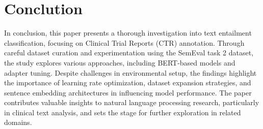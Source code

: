 \section{Conclution}

In conclusion, this paper presents a thorough investigation into text entailment classification, 
focusing on Clinical Trial Reports (CTR) annotation. Through careful dataset curation and 
experimentation using the SemEval task 2 dataset, the study explores various approaches, 
including BERT-based models and adapter tuning. Despite challenges in environmental setup, 
the findings highlight the importance of learning rate optimization, dataset expansion 
strategies, and sentence embedding architectures in influencing model performance. 
The paper contributes valuable insights to natural language processing research, 
particularly in clinical text analysis, and sets the stage for further exploration 
in related domains.